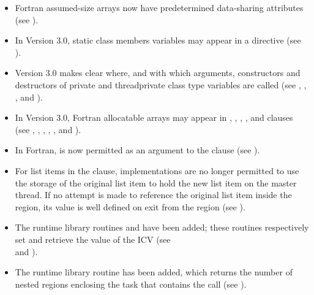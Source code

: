 \begin{itemize}
\item Fortran assumed-size arrays now have predetermined data-sharing attributes (see
).

\item In Version 3.0, static class members variables may appear in a 
directive (see
).

\item Version 3.0 makes clear where, and with which arguments, constructors and
destructors of private and threadprivate class type variables are called (see
,
,
,
 and
).

\item In Version 3.0, Fortran allocatable arrays may appear in ,
, , ,  and 
clauses (see
,
,
,
,
,
 and
).

\item In Fortran,  is now permitted as an argument to the 
clause (see
).

\item For list items in the  clause, implementations are no longer permitted to use
the storage of the original list item to hold the new list item on the master thread. If
no attempt is made to reference the original list item inside the  region, its
value is well defined on exit from the  region (see
).

\item The runtime library routines  and 
have been added; these routines respectively set and retrieve the value of the
 ICV (see\\
 and
).

\item The  runtime library routine has been added, which returns the
number of nested  regions enclosing the task that contains the call (see
).


\end{itemize}
